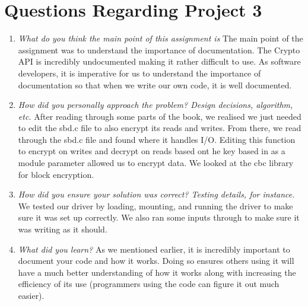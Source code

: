 \section{Questions Regarding Project 3}
\begin{enumerate}

   \item \textit{What do you think the main point of this assignment is} The main point of the assignment was to understand the importance of documentation. The Crypto API is incredibly undocumented making it rather difficult to use. As software developers, it is imperative for us to understand the importance of documentation so that when we write our own code, it is well documented. 

   \item \textit{How did you personally approach the problem? Design decisions, algorithm, etc.} After reading through some parts of the book, we realised we just needed to edit the sbd.c file to also encrypt its reads and writes. From there, we read through the sbd.c file and found where it handles I/O. Editing this function to encrypt on writes and decrypt on reads based ont he key based in as a module parameter allowed us to encrypt data. We looked at the cbc library for block encryption.  

   \item \textit{How did you ensure your solution was correct? Testing details, for instance.} We tested our driver by loading, mounting, and running the driver to make sure it was set up correctly. We also ran some inputs through to make sure it was writing as it should. 

   \item \textit{What did you learn?} As we mentioned earlier, it is incredibly important to document your code and how it works. Doing so ensures others using it will have a much better understanding of how it works along with increasing the efficiency of its use (programmers using the code can figure it out much easier).   

\end{enumerate}


